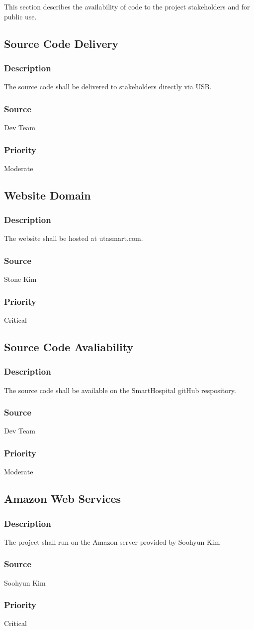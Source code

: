 This section describes the availability of code to the project stakeholders and for public use.

\subsection{Source Code Delivery}
\subsubsection{Description}
The source code shall be delivered to stakeholders directly via USB.
\subsubsection{Source}
Dev Team
\subsubsection{Priority}
Moderate

\subsection{Website Domain}
\subsubsection{Description}
The website shall be hosted at utasmart.com.
\subsubsection{Source}
Stone Kim
\subsubsection{Priority}
Critical

\subsection{Source Code Avaliability}
\subsubsection{Description}
The source code shall be available on the SmartHospital gitHub respository.
\subsubsection{Source}
Dev Team
\subsubsection{Priority}
Moderate

\subsection{Amazon Web Services}
\subsubsection{Description}
The project shall run on the Amazon server provided by Soohyun Kim
\subsubsection{Source}
Soohyun Kim
\subsubsection{Priority}
Critical